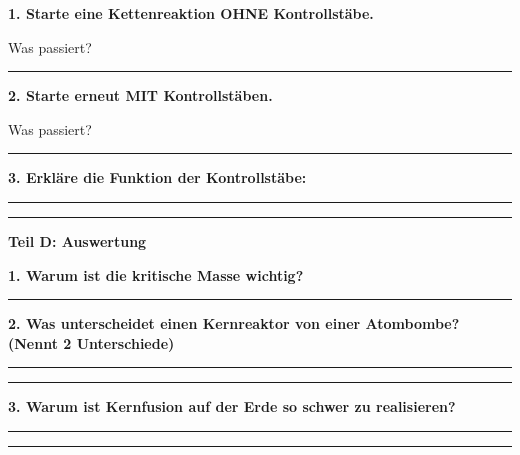 \documentclass[10pt, a4paper]{article}
\newcommand{\fachfarbe}{physik}
\newcommand{\luecke}[1]{\rule{#1}{0.4pt}}
\newcommand{\abschnitt}[1]{%
    \vspace{8pt}\noindent\textbf{\textcolor{\fachfarbe}{#1}}\vspace{4pt}
}
\begin{document}
\textbf{1. Starte eine Kettenreaktion OHNE Kontrollstäbe.}

Was passiert? \luecke{10cm}

\vspace{8pt}

\textbf{2. Starte erneut MIT Kontrollstäben.}

Was passiert? \luecke{10cm}

\vspace{8pt}

\textbf{3. Erkläre die Funktion der Kontrollstäbe:}

\luecke{14cm}

\vspace{4pt}
\luecke{14cm}

\vspace{12pt}

\abschnitt{Teil D: Auswertung}

\textbf{1. Warum ist die kritische Masse wichtig?}

\vspace{4pt}
\luecke{14cm}

\vspace{8pt}

\textbf{2. Was unterscheidet einen Kernreaktor von einer Atombombe? (Nennt 2 Unterschiede)}

\vspace{4pt}
\luecke{14cm}

\vspace{4pt}
\luecke{14cm}

\vspace{8pt}

\textbf{3. Warum ist Kernfusion auf der Erde so schwer zu realisieren?}

\vspace{4pt}
\luecke{14cm}

\vspace{4pt}
\luecke{14cm}
\end{document}
